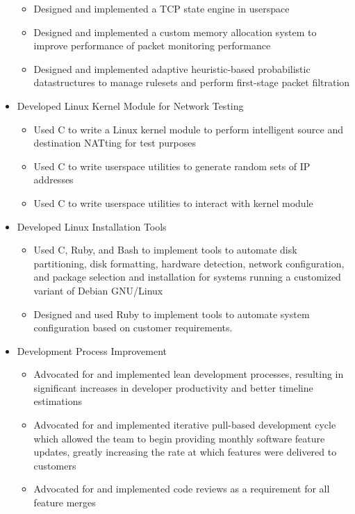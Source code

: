 \documentclass[margin,line]{resume}
\begin{document}
\begin{resume}
\begin{itemize}
\begin{itemize}
            \item Designed and implemented a TCP state engine in userspace
            \item Designed and implemented a custom memory allocation system to
                improve performance of packet monitoring performance
            \item Designed and implemented adaptive heuristic-based
                probabilistic datastructures to manage rulesets and perform
                first-stage packet filtration
        \end{itemize}
    \item Developed Linux Kernel Module for Network Testing
        \begin{itemize}
            \item Used C to write a Linux kernel module to perform intelligent
                source and destination NATting for test purposes
            \item Used C to write userspace utilities to generate random sets
                of IP addresses
            \item Used C to write userspace utilities to interact with kernel
                module
        \end{itemize}
    \item Developed Linux Installation Tools
        \begin{itemize}
            \item Used C, Ruby, and Bash to implement tools to automate disk
                  partitioning, disk formatting, hardware detection, network
                  configuration, and package selection and installation for
                  systems running a customized variant of Debian GNU/Linux
              \item Designed and used Ruby to implement tools to automate
                  system configuration based on customer requirements.
        \end{itemize}
    \item Development Process Improvement
        \begin{itemize}
            \item Advocated for and implemented lean development processes,
                resulting in significant increases in developer productivity
                and better timeline estimations
            \item Advocated for and implemented iterative pull-based
                development cycle which allowed the team to begin providing
                monthly software feature updates, greatly increasing the rate
                at which features were delivered to customers
            \item Advocated for and implemented code reviews as a requirement
                for all feature merges
        \end{itemize}
\end{itemize}


\end{resume}
\end{document}

